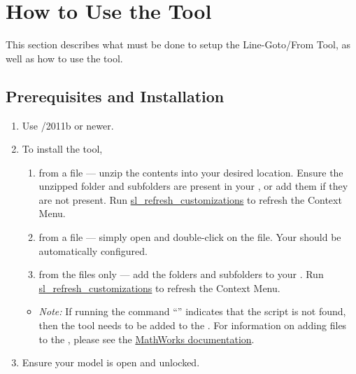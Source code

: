 \documentclass{article}
\makeatletter
\newcommand{\ToolName}{Line-Goto/From Tool\@\xspace}
\makeatother
\begin{document}
\section{How to Use the Tool}
This section describes what must be done to setup the \ToolName, as well as how to use the tool.

\subsection{Prerequisites and Installation}

\begin{enumerate}
  \item Use \Matlab/\Simulink 2011b or newer.
	\item To install the tool,
	\begin{enumerate}
		\item from a  file --- unzip the contents into your desired location. Ensure the unzipped folder and subfolders are present in your \mpath, or add them if they are not present. Run \href{https://www.mathworks.com/help/simulink/ug/registering-customizations.html}{sl\_refresh\_customizations} to refresh the Context Menu. 
		\item from a  file --- simply open \Matlab and double-click on the file. Your \mpath should be automatically configured.
		\item from the files only --- add the folders and subfolders to your \mpath. Run \href{https://www.mathworks.com/help/simulink/ug/registering-customizations.html}{sl\_refresh\_customizations} to refresh the Context Menu.
	\end{enumerate}
	\begin{itemize}
		\item \textit{Note:} If running the command ``'' indicates that the script is not found, then the tool needs to be added to the \mpath.
		For information on adding files to the \mpath, please see the \href{https://www.mathworks.com/help/matlab/matlab_env/add-remove-or-reorder-folders-on-the-search-path.html}{MathWorks documentation}.
	\end{itemize}
	\item Ensure your model is open and unlocked.
\end{enumerate}
\end{document}
